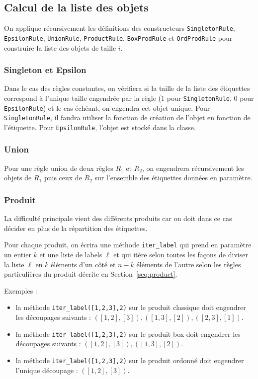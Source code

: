 \documentclass[11pt]{article}
\newcommand{\EpsilonRule}{\texttt{EpsilonRule}\xspace}
\newcommand{\SingletonRule}{\texttt{SingletonRule}\xspace}
\newcommand{\UnionRule}{\texttt{UnionRule}\xspace}
\newcommand{\ProductRule}{\texttt{ProductRule}\xspace}
\newcommand{\BoxProdRule}{\texttt{BoxProdRule}\xspace}
\newcommand{\OrdProdRule}{\texttt{OrdProdRule}\xspace}
\begin{document}
\subsection{Calcul de la liste des objets}

On applique récursivement les définitions des constructeurs \SingletonRule,
\EpsilonRule, \UnionRule, \ProductRule, \BoxProdRule et \OrdProdRule pour
construire la liste des objets de taille $i$.

\subsubsection{Singleton et Epsilon}

Dans le cas des règles constantes, on vérifiera si la taille de la liste des
étiquettes correspond à l'unique taille engendrée par la règle (1 pour
\SingletonRule, 0 pour \EpsilonRule) et le cas échéant, on engendra cet objet
unique. Pour \SingletonRule, il faudra utiliser la fonction de création de
l'objet en fonction de l'étiquette.  Pour \EpsilonRule, l'objet est stocké
dans la classe.

\subsubsection{Union}

Pour une règle union de deux règles $R_1$ et $R_2$, on engendrera récursivement
les objets de $R_1$ puis ceux de $R_2$ sur l'ensemble des étiquettes données
en paramètre.

\subsubsection{Produit}

La difficulté principale vient des différents produits car on doit dans ce cas
décider en plus de la répartition des étiquettes.

Pour chaque produit, on écrira une méthode \texttt{iter\_label} qui prend en
paramètre un entier $k$ et une liste de labels $\ell$ et qui itère selon
toutes les façons de diviser la liste $\ell$ en $k$ éléments d'un côté et
$n-k$ éléments de l'autre selon les règles particulières du produit décrite en
Section~\ref{seq:product}.

Exemples :
\begin{itemize}
\item la méthode \texttt{iter\_label([1,2,3],2)} sur le produit classique doit
  engendrer les découpages suivants : $([1,2], [3]), ([1,3], [2]), ([2,3],
  [1])$.
\item la méthode \texttt{iter\_label([1,2,3],2)} sur le produit box doit
  engendrer les découpages suivants : $([1,2], [3]), ([1,3], [2])$.
\item la méthode \texttt{iter\_label([1,2,3],2)} sur le produit ordonné doit
  engendrer l'unique découpage : $([1,2], [3])$.
\end{itemize}
\end{document}
